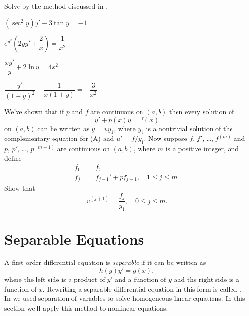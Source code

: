 \begin{exerciselist}
\item\label{exer:2.1.48}Solve by the method discussed in .

\begin{alist*}[columns=2]
\item $(\sec^2y)y'- 3\tan y=-1$
\item $e^{y^2}\left(2yy'+\dfrac{2}{x}\right) =\dfrac{1}{x^2}$
\item $\dfrac{xy'}{y} + 2\ln y=4x^2$
\item $\dfrac{y'}{(1+y)^2} -\dfrac{1}{x(1+y)}=-\dfrac{3}{x^2}$
\end{alist*}

\item\label{exer:2.1.49}We've shown that if $p$ and $f$ are continuous on $(a,b)$
then every solution of
\[
y'+p(x)y=f(x)\tag{A}
\]
on $(a,b)$ can be written as $y=uy_1$, where
$y_1$ is a nontrivial solution of the complementary equation for (A)
and $u'=f/y_1$. Now suppose   $f$, $f'$, \dots, $f^{(m)}$ and
$p$, $p'$, \dots, $p^{(m-1)}$ are continuous on $(a,b)$, where $m$
is a positive integer, and define
\begin{align*}
f_0&=f,\\
f_j&=f_{j-1}'+pf_{j-1},\quad 1\le j\le m.
\end{align*}
Show that
\[
u^{(j+1)}=\frac{f_j}{y_1},\quad 0\le j\le m.
\]

\end{exerciselist}


\section{Separable Equations}\label{sec:separable}

A first order differential equation  is
\emph{\color{blue}separable} if it can be written as
\begin{equation} \label{eq:2.2.1}
h(y)y'=g(x),
\end{equation}
where the left side is a product of $y'$ and a function of $y$ and
the right side is a function of $x$. Rewriting a separable
differential equation in this form is called
.
In  we used separation of variables
to solve homogeneous linear equations. In this section we'll apply
this method to nonlinear equations.

